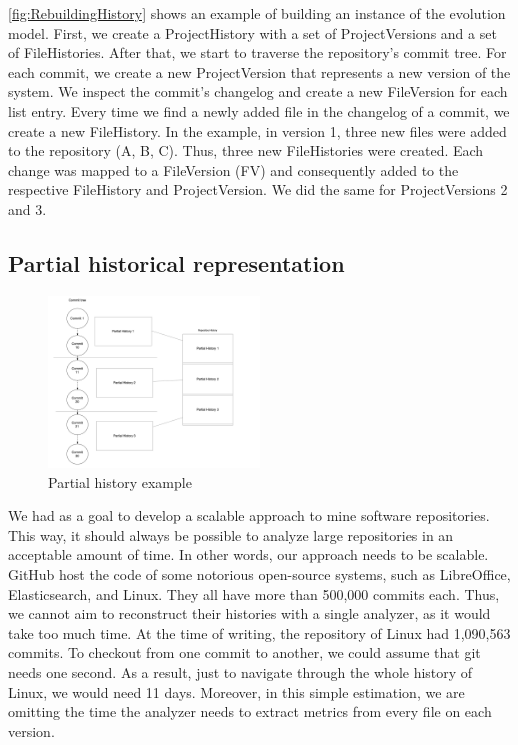 \autoref{fig:RebuildingHistory} shows an example of building an instance of the evolution model.
First, we create a ProjectHistory with a set of ProjectVersions and a set of FileHistories.
After that, we start to traverse the repository's commit tree.
For each commit, we create a new ProjectVersion that represents a new version of the system. 
We inspect the commit's changelog and create a new FileVersion for each list entry.
Every time we find a newly added file in the changelog of a commit, we create a new FileHistory. 
In the example, in version 1, three new files were added to the repository (A, B, C). Thus, three new FileHistories were created.
Each change was mapped to a FileVersion (FV) and consequently added to the respective FileHistory and ProjectVersion. 
We did the same for ProjectVersions 2 and 3. 

\label{sec:partialHistoricalRepr}
\subsection{Partial historical representation}
\begin{figure}[ht]
    \begin{center}
        \includegraphics[width=0.5\textwidth]{PartialHistory.png}
    \end{center}
    \caption{Partial history example}
    \label{fig:PartialHistory}
\end{figure}
We had as a goal to develop a scalable approach to mine software repositories. This way, it should always be possible to analyze large repositories in an acceptable amount of time. 
In other words, our approach needs to be scalable.
GitHub host the code of some notorious open-source systems, such as LibreOffice, Elasticsearch, and Linux.
They all have more than 500,000 commits each. Thus, we cannot aim to reconstruct their histories with a single analyzer, as it would take too much time.  
At the time of writing, the repository of Linux had 1,090,563 commits. 
To checkout from one commit to another, we could assume that git needs one second. 
As a result, just to navigate through the whole history of Linux, we would need 11 days.
Moreover, in this simple estimation, we are omitting the time the analyzer needs to extract metrics from every file on each version. 

